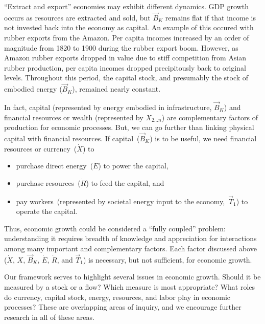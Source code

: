 ``Extract and export'' economies may exhibit different dynamics.
GDP growth occurs as resources are extracted and sold, 
but $\vec{B}_{K}$ remains flat if that income is not 
invested back into the economy as capital. 
An example of this occured with rubber exports from the Amazon.
Per capita incomes increased by an order of magnitude 
from 1820 to 1900 during the rubber export boom. 
However, as Amazon rubber exports dropped in value
due to stiff competition from Asian rubber production, 
per capita incomes dropped precipitously back to original levels. 
Throughout this period, the capital stock, 
and presumably the stock of embodied energy ($\vec{B}_{K}$), 
remained nearly constant.\cite{bunker1984modes}

In fact, capital (represented by energy embodied in infrastructure, $\vec{B}_{K}$) and 
financial resources or wealth (represented by $X_{2 \ldots n}$) 
are complementary factors of production for economic processes. 
But, we can go further than linking physical capital with financial resources.
If capital~($\vec{B}_{K}$) is to be useful, we need financial resources
or currency~($\dot{X}$) to 
%
\begin{itemize}
	
	\item{purchase direct energy~($\dot{E}$) to power the capital,}
	
	\item{purchase resources~($\dot{R}$) to feed the capital, and}
	
	\item{pay workers~(represented 
	by societal energy input to the economy,~$\vec{T}_{1}$) 
	to operate the capital.}

\end{itemize}

Thus, economic growth could be considered a ``fully coupled'' problem:
understanding it requires breadth of knowledge and appreciation for 
interactions among many important and complementary factors.
Each factor discussed above 
($\dot{X}$, $X$, $\vec{B}_{K}$, $\dot{E}$, $\dot{R}$, and $\vec{T}_{1}$)
is necessary, but not sufficient, for economic growth.

Our framework serves to highlight several issues in economic growth. 
Should it be measured by a stock or a flow? 
Which measure is most appropriate? 
What roles do currency, capital stock, energy, resources, and labor
play in economic processes?
These are overlapping areas of inquiry, and
we encourage further research in all of these areas.


